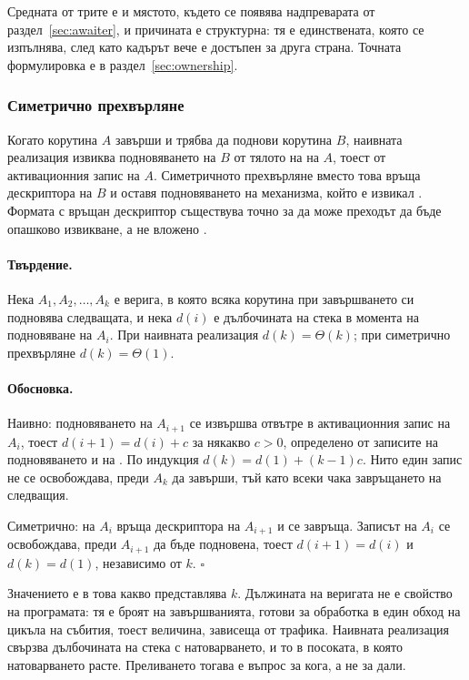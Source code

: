 Средната от трите е и мястото, където се появява надпреварата от раздел~\ref{sec:awaiter}, и
причината е структурна: тя е единствената, която се изпълнява, след като кадърът вече е
достъпен за друга страна. Точната формулировка е в раздел~\ref{sec:ownership}.

\subsubsection{Симетрично прехвърляне}

Когато корутина \(A\) завърши и трябва да поднови корутина \(B\), наивната реализация извиква
подновяването на \(B\) от тялото на  на \(A\), тоест от активационния
запис на \(A\). Симетричното прехвърляне вместо това връща дескриптора на \(B\) и оставя
подновяването на механизма, който е извикал . Формата с връщан
дескриптор съществува точно за да може преходът да бъде опашково извикване, а не вложено
\cite{cpp20standard}.

\paragraph{Твърдение.} Нека \(A_1, A_2, \dots, A_k\) е верига, в която всяка корутина при
завършването си подновява следващата, и нека \(d(i)\) е дълбочината на стека в момента на
подновяване на \(A_i\). При наивната реализация \(d(k) = \Theta(k)\); при симетрично
прехвърляне \(d(k) = \Theta(1)\).

\paragraph{Обосновка.} Наивно: подновяването на \(A_{i+1}\) се извършва отвътре в
активационния запис на \(A_i\), тоест \(d(i+1) = d(i) + c\) за някакво \(c > 0\), определено
от записите на подновяването и на . По индукция
\(d(k) = d(1) + (k-1)c\). Нито един запис не се освобождава, преди \(A_k\) да завърши, тъй
като всеки чака завръщането на следващия.

Симетрично:  на \(A_i\) връща дескриптора на \(A_{i+1}\) и се завръща.
Записът на \(A_i\) се освобождава, преди \(A_{i+1}\) да бъде подновена, тоест
\(d(i+1) = d(i)\) и \(d(k) = d(1)\), независимо от \(k\). \(\square\)

Значението е в това какво представлява \(k\). Дължината на веригата не е свойство на
програмата: тя е броят на завършванията, готови за обработка в един обход на цикъла на
събития, тоест величина, зависеща от трафика. Наивната реализация свързва дълбочината на
стека с натоварването, и то в посоката, в която натоварването расте. Преливането тогава е
въпрос за кога, а не за дали.

